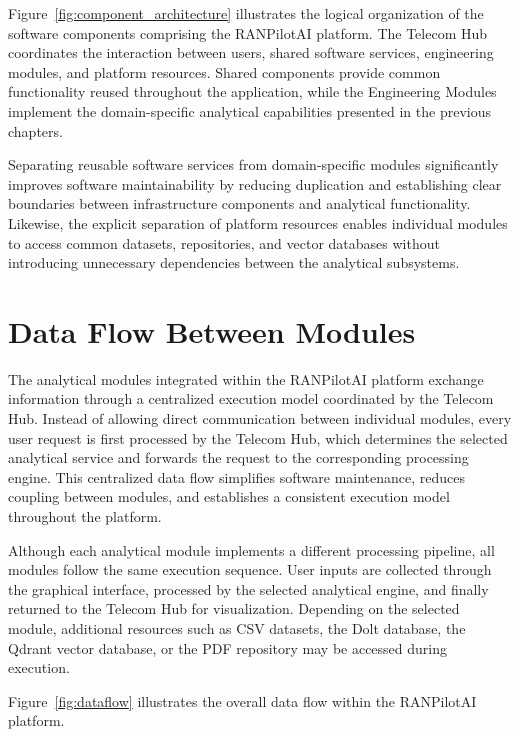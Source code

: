 Figure~\ref{fig:component_architecture} illustrates the logical organization of the software components comprising the RANPilotAI platform. The Telecom Hub coordinates the interaction between users, shared software services, engineering modules, and platform resources. Shared components provide common functionality reused throughout the application, while the Engineering Modules implement the domain-specific analytical capabilities presented in the previous chapters.

Separating reusable software services from domain-specific modules significantly improves software maintainability by reducing duplication and establishing clear boundaries between infrastructure components and analytical functionality. Likewise, the explicit separation of platform resources enables individual modules to access common datasets, repositories, and vector databases without introducing unnecessary dependencies between the analytical subsystems.
\section{Data Flow Between Modules}

The analytical modules integrated within the RANPilotAI platform exchange information through a centralized execution model coordinated by the Telecom Hub. Instead of allowing direct communication between individual modules, every user request is first processed by the Telecom Hub, which determines the selected analytical service and forwards the request to the corresponding processing engine. This centralized data flow simplifies software maintenance, reduces coupling between modules, and establishes a consistent execution model throughout the platform.

Although each analytical module implements a different processing pipeline, all modules follow the same execution sequence. User inputs are collected through the graphical interface, processed by the selected analytical engine, and finally returned to the Telecom Hub for visualization. Depending on the selected module, additional resources such as CSV datasets, the Dolt database, the Qdrant vector database, or the PDF repository may be accessed during execution.

Figure~\ref{fig:dataflow} illustrates the overall data flow within the RANPilotAI platform.


